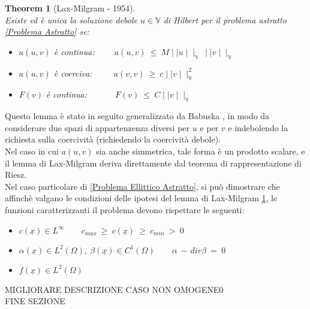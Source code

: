 \documentclass[12pt,a4paper]{report}
\theoremstyle{theorem}
\newtheorem{theorem}{Theorem}[section]
\theoremstyle{definition}
\begin{document}
\begin{theorem} [Lax-Milgram - 1954]  \label{Lemma di Lax-Milgram}
\hfill \\
Esiste ed è unica la soluzione debole $u \in \mathbb{V}$ di Hilbert per il problema astratto \ref{Problema Astratto} se:
\begin{itemize}
	\item $a(u,v)$ è continua: $\qquad a(u,v) \ \leq \ M \mid \mid u \mid \mid_{\mathbb{V}} \, \mid \mid v \mid \mid_{\mathbb{V}}$
	\item $a(u,v)$ è coerciva: $\qquad \ a(v,v) \ \geq \ c \mid \mid v \mid  \mid_{\mathbb{V}}^{2}$
	\item $F(v)$ è continua: $\qquad \quad F(v) \ \leq \ C \mid \mid v \mid \mid_{\mathbb{V}}$
\end{itemize}

\end{theorem}
Questo lemma è stato in seguito generalizzato da Babuska \cite{babuska1971BLM}, in modo da considerare due spazi di appartenzenza diversi per $u$ e per $v$ e indebolendo la richiesta sulla coercività (richiedendo la coercività debole).\\
Nel caso in cui $a(u,v)$ sia anche simmetrica, tale forma è un prodotto scalare, e il lemma di Lax-Milgram deriva direttamente dal teorema di rappresentazione di Riesz. \\
Nel caso particolare di \ref{Problema Ellittico Astratto}, si può dimostrare che affinchè valgano le condizioni delle ipotesi del lemma di Lax-Milgram \ref{Lemma di Lax-Milgram}, le funzioni caratterizzanti il problema devono rispettare le seguenti:
\begin{itemize}
	\item $c(\underline{x}) \in L^{\infty} \qquad c_{max} \ \geq \ c(\underline{x}) \ \geq \ c_{min} \ > \ 0 $
	\item $\alpha(\underline{x}) \in L^{2}(\Omega), \ \beta(\underline{x}) \in C^{1}(\Omega) \qquad \alpha \, - \, div \beta \ = \ 0$
	\item $f(\underline{x}) \in L^{2}(\Omega)$
\end{itemize}
{ \color{red} MIGLIORARE DESCRIZIONE CASO NON OMOGENE0\\}
{ \color{blue} FINE SEZIONE\\}
\end{document}
